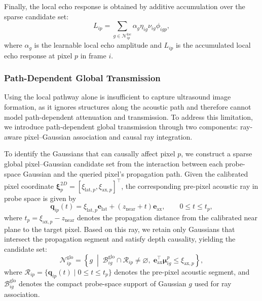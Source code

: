 Finally, the local echo response is obtained by additive accumulation over the
sparse candidate set:
\begin{equation}
L_{ip}
=
\sum_{g\in\mathcal N^{\mathrm{loc}}_{ip}}
\alpha_g
\eta_{ig}
\nu_{ig}
\phi_{igp},
\label{eq:local-response}
\end{equation}
where $\alpha_g$ is the learnable local echo amplitude and $L_{ip}$ is the
accumulated local echo response at pixel $p$ in frame $i$.

\subsubsection{Path-Dependent Global Transmission}

Using the local pathway alone is insufficient to capture ultrasound image
formation, as it ignores structures along the acoustic path and
therefore cannot model path-dependent attenuation and transmission. To address
this limitation, we introduce path-dependent global transmission through two
components: ray-aware pixel--Gaussian association and causal ray integration.

To identify the Gaussians that can causally affect pixel $p$, we construct a
sparse global pixel--Gaussian candidate set from the interaction between each
probe-space Gaussian and the queried pixel's propagation path. Given the
calibrated pixel coordinate
$\boldsymbol\xi^{2D}_{p}
=
[\xi_{\mathrm{lat},p},\xi_{\mathrm{ax},p}]^\top$,
the corresponding pre-pixel acoustic ray in probe space is given by
\begin{equation}
\mathbf q_{ip}(t)
=
\xi_{\mathrm{lat},p}\mathbf e_{\mathrm{lat}}
+
\left(z_{\mathrm{near}}+t\right)\mathbf e_{\mathrm{ax}},
\qquad
0\leq t\leq t_p,
\label{eq:global-ray}
\end{equation}
where
$t_p=\xi_{\mathrm{ax},p}-z_{\mathrm{near}}$
denotes the propagation distance from the calibrated near plane to the target
pixel. Based on this ray, we retain only Gaussians that intersect the
propagation segment and satisfy depth causality, yielding the candidate set:
\begin{equation}
\mathcal N^{\mathrm{glo}}_{ip}
=
\left\{
g
\;\middle|\;
\mathcal B^{\mathrm{glo}}_{ig}
\cap
\mathcal R_{ip}
\neq
\varnothing,\;
\mathbf e_{\mathrm{ax}}^\top
\boldsymbol\mu^{p}_{ig}
\leq
\xi_{\mathrm{ax},p}
\right\},
\label{eq:global-candidate-set}
\end{equation}
where
$\mathcal R_{ip}
=
\{\mathbf q_{ip}(t)\mid0\leq t\leq t_p\}$
denotes the pre-pixel acoustic segment, and
$\mathcal B^{\mathrm{glo}}_{ig}$ denotes the compact probe-space support of
Gaussian $g$ used for ray association.


